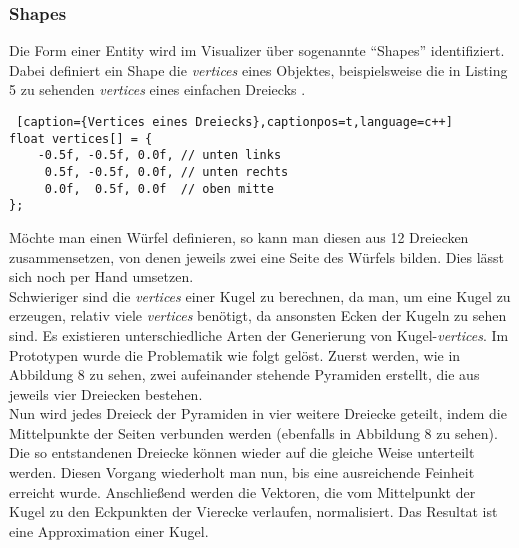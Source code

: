 \documentclass[11pt,a4paper]{article}
\begin{document}
\subsubsection{Shapes}
Die Form einer Entity wird im Visualizer über sogenannte ``Shapes'' identifiziert. Dabei definiert ein Shape die \mbox{\textit{vertices}} eines Objektes, beispielsweise die in Listing 5 zu sehenden \mbox{\textit{vertices}} eines einfachen Dreiecks \cite[Kap. ``Hello Tiangle'']{LearnOpenGL}.

\begin{lstlisting} [caption={Vertices eines Dreiecks},captionpos=t,language=c++]
float vertices[] = {
    -0.5f, -0.5f, 0.0f, // unten links
     0.5f, -0.5f, 0.0f, // unten rechts
     0.0f,  0.5f, 0.0f  // oben mitte
};
\end{lstlisting}
\noindent
Möchte man einen Würfel definieren, so kann man diesen aus 12 Dreiecken zusammensetzen, von denen jeweils zwei eine Seite des Würfels bilden. Dies lässt sich noch per Hand umsetzen.\\
Schwieriger sind die  \mbox{\textit{vertices}} einer Kugel zu berechnen, da man, um eine Kugel zu erzeugen, relativ viele  \mbox{\textit{vertices}} benötigt, da ansonsten Ecken der Kugeln zu sehen sind. Es existieren unterschiedliche Arten der Generierung von Kugel-\mbox{\textit{vertices}}. Im Prototypen wurde die Problematik wie folgt gelöst. Zuerst werden, wie in Abbildung 8 zu sehen, zwei aufeinander stehende Pyramiden erstellt, die aus jeweils vier Dreiecken bestehen.\\
Nun wird jedes Dreieck der Pyramiden in vier weitere Dreiecke geteilt, indem die Mittelpunkte der Seiten verbunden werden (ebenfalls in Abbildung 8 zu sehen). Die so entstandenen Dreiecke können wieder auf die gleiche Weise unterteilt werden. Diesen Vorgang wiederholt man nun, bis eine ausreichende Feinheit erreicht wurde. Anschließend werden die Vektoren, die vom Mittelpunkt der Kugel zu den Eckpunkten der Vierecke verlaufen, normalisiert. Das Resultat ist eine Approximation einer Kugel.\\
\end{document}
